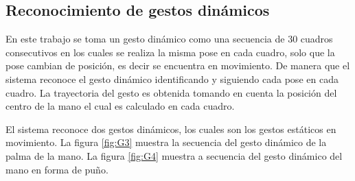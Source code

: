 \subsection{Reconocimiento de gestos dinámicos}\label{RecognitionDynamic}


En este trabajo se toma un gesto dinámico como una secuencia de $30$ cuadros consecutivos en los cuales se realiza la misma pose en cada cuadro, solo que la pose cambian de posición, es decir se encuentra en movimiento. De manera que el sistema reconoce el gesto dinámico identificando y siguiendo cada pose en cada cuadro. La trayectoria del gesto es obtenida tomando en cuenta la posición del centro de la mano el cual es calculado en cada cuadro. 
 
El sistema reconoce dos gestos dinámicos, los cuales son los gestos estáticos en movimiento. La figura \ref{fig:G3} muestra la secuencia del gesto dinámico de la palma de la mano. La figura \ref{fig:G4} muestra a secuencia del gesto dinámico del mano en forma de pu\~no.  
